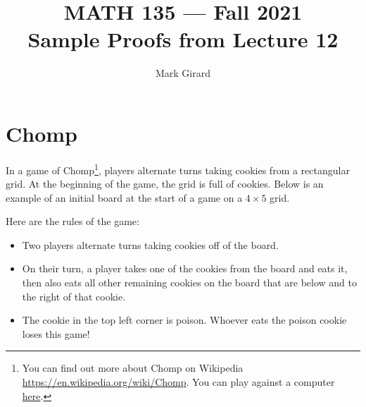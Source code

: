 \documentclass[11pt]{article}
\theoremstyle{plain}
\theoremstyle{plain}
\theoremstyle{remark}
\begin{document}
\title{MATH 135 --- Fall 2021\\ Sample Proofs from Lecture 12}
\author{Mark Girard}

\maketitle

\section*{Chomp}
In a game of Chomp\footnote{You can find out more about Chomp on Wikipedia \url{https://en.wikipedia.org/wiki/Chomp}. You can play against a computer \href{https://www.math.ucla.edu/~tom/Games/chomp.html}{here}.}, players alternate turns taking cookies from a rectangular grid. At the beginning of the game, the grid is full of cookies. Below is an example of an initial board at the start of a game on a $4\times 5$ grid.

\begin{center}
\end{center}

\noindent Here are the rules of the game:
\begin{itemize}
 \item Two players alternate turns taking cookies off of the board. 
 \item On their turn, a player takes one of the cookies from the board and eats it, then also eats all other remaining cookies on the board that are below and to the right of that cookie. 
 \item The cookie in the top left corner is poison. Whoever eats the poison cookie loses this game! 
\end{itemize}
\end{document}
